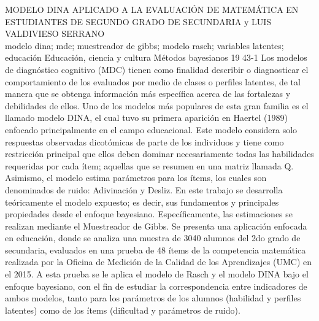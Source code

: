 \A
{MODELO DINA APLICADO A LA EVALUACIÓN DE MATEMÁTICA EN ESTUDIANTES DE SEGUNDO GRADO DE SECUNDARIA}
{ y LUIS VALDIVIESO SERRANO}
{
\\}
{modelo dina; mdc; muestreador de gibbs; modelo rasch; variables latentes; educación} 
 {Educación, ciencia y cultura} 
 {Métodos bayesianos} 
 {19} 
 {43-1}
{Los modelos de diagnóstico cognitivo (MDC) tienen como finalidad describir o diagnosticar el comportamiento de los evaluados por medio de clases o perfiles latentes, de tal manera que se obtenga información más específica acerca de las fortalezas y debilidades de ellos. Uno de los modelos más populares de esta gran familia es el llamado modelo DINA, el cual tuvo su primera aparición en Haertel (1989) enfocado principalmente en el campo educacional. Este modelo considera solo respuestas observadas dicotómicas de parte de los individuos y tiene como restricción principal que ellos deben dominar necesariamente todas las habilidades requeridas por cada ítem; aquellas que se resumen en una matriz llamada Q. Asimismo, el modelo estima parámetros para los ítems, los cuales son denominados de ruido: Adivinación y Desliz. En este trabajo se desarrolla teóricamente el modelo expuesto; es decir, sus fundamentos y principales propiedades desde el enfoque bayesiano. Específicamente, las estimaciones se realizan mediante el Muestreador de Gibbs. Se presenta una aplicación enfocada en educación, donde se analiza una muestra de 3040 alumnos del 2do grado de secundaria, evaluados en una prueba de 48 ítems de la competencia matemática realizada por la Oficina de Medición de la Calidad de los Aprendizajes (UMC) en el 2015. A esta prueba se le aplica el modelo de Rasch y el modelo DINA bajo el enfoque bayesiano, con el fin de estudiar la correspondencia entre indicadores de ambos modelos, tanto para los parámetros de los alumnos (habilidad y perfiles latentes) como de los ítems (dificultad y parámetros de ruido).}
